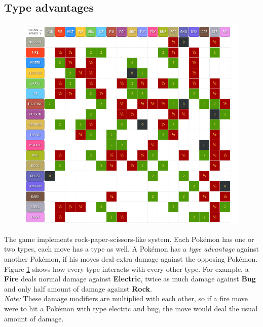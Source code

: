 \documentclass{article}
\begin{document}
\subsection{Type advantages}
\begin{figure}[ht]
  \centering
  \includegraphics[width=.9\linewidth]{images/Types.png}
  \label{fig:type-chart}
\end{figure}
The game implements rock-paper-scissors-like system. Each Pokémon has one
or two types, each move has a type as well. A Pokémon has a \textit{type advantage}
against another Pokémon, if his moves deal extra damage against the opposing Pokémon.
Figure \ref{fig:type-chart} shows how every type interacts with every other type.
For example, a \textbf{Fire} deals normal damage against \textbf{Electric}, twice
as much damage against \textbf{Bug} and only half amount of damage against
\textbf{Rock}. \\
\textit{Note:} These damage modifiers are multiplied with each other, so if a 
fire move were to hit a Pokémon with type electric and bug, the move would
deal the usual amount of damage.
\end{document}
